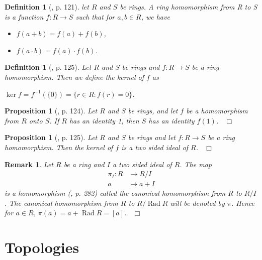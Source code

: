 \documentclass[12pt, oneside]{book}
\newtheorem{proposition}[theorem]{Proposition}
\newtheorem{definition}[theorem]{Definition}
\newtheorem{remark}[theorem]{Remark}
\newcommand{\qed}{\hfill ~$\Box$\\}
\def\Rad{\operatorname{Rad}}
\def\ker{\operatorname{ker}}
\begin{document}
\begin{definition}[\cite{G1}, p. 121] 
\normalfont
\noindent let $R$ and $S$ be rings. A {\sl ring homomorphism from R to S} is a function 
$f : R \rightarrow S$ such that for $a, b \in R$, we have 
\begin{itemize}
\item [H1.] \quad $f(a+b)=f(a)+f(b)$,
\item [H2.] \quad $f(a \cdot b)=f(a) \cdot f(b)$.
\end{itemize}
\end{definition}
\begin{definition}[\cite{G1}, p. 125]
\normalfont
\noindent Let $R$ and $S$ be rings and $f: R \rightarrow S$ be a ring homomorphism. Then we define the {\sl kernel} of $f$ as 
\begin{center}
$\ker f = f^{-1}(\{0\}) = \{ r \in R : f(r) = 0 \}$.
\end{center}
\end{definition}
\begin{proposition}[\cite{G1}, p. 124] \label{RingHomomOnto}
\normalfont
\noindent Let $R$ and $S$ be rings, and let $f$ be a homomorphism from $R$ onto $S$. 
If $R$ has an identity 1, then $S$ has an identity $f(1)$. \qed
\end{proposition}
\begin{proposition}[\cite{G1}, p. 125] \label{KerIsAnIdeal}
\normalfont
\noindent Let $R$ and $S$ be rings and let $f : R \rightarrow S$ be a ring homomorphism. 
Then the kernel of $f$ is a two sided ideal of $R$. \qed
\end{proposition}

\begin{remark}
\normalfont
\noindent Let $R$ be a ring and $I$ a two sided ideal of $R$. The map
\begin{align*}
\pi_I : R &\rightarrow R/I\\
a &\mapsto a + I
\end{align*}
is a homomorphism (\cite{G}, p. 282) called the {\sl canonical homomorphism} from $R$ to $R/I$.
\vskip 0.3cm
\noindent The canonical homomorphism from $R$ to $R/\Rad R$ will be denoted by $\pi$. Hence for 
$a \in R$, $\pi(a) = a + \Rad R = [a]$.
\qed
\end{remark}

\section{Topologies}
\end{document}
